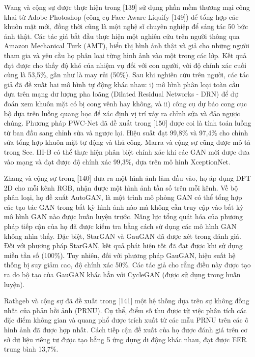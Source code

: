 \documentclass{article}
\begin{document}
Wang và cộng sự được thực hiện trong [139] sử dụng phần mềm thương mại công khai từ Adobe Photoshop (công cụ Face-Aware Liquify [149]) để tổng hợp các khuôn mặt mới, đồng thời cũng là một nghệ sĩ chuyên nghiệp để sáng tác 50 bức ảnh thật. Các tác giả bắt đầu thực hiện một nghiên cứu trên người thông qua Amazon Mechanical Turk (AMT), hiển thị hình ảnh thật và giả cho những người tham gia và yêu cầu họ phân loại từng hình ảnh vào một trong các lớp. Kết quả đạt được cho thấy độ khó của nhiệm vụ đối với con người, với độ chính xác cuối cùng là 53,5\%, gần như là may rủi (50\%). Sau khi nghiên cứu trên người, các tác giả đã đề xuất hai mô hình tự động khác nhau: i) mô hình phân loại toàn cầu dựa trên mạng dư lượng pha loãng (Dilated Residual Networks - DRN) để dự đoán xem khuôn mặt có bị cong vênh hay không, và ii) công cụ dự báo cong cục bộ dựa trên luồng quang học để xác định vị trí xảy ra chỉnh sửa và đảo ngược chúng. Phương pháp PWC-Net đã đề xuất trong [150] được coi là tính toán luồng từ ban đầu sang chỉnh sửa và ngược lại. Hiệu suất đạt 99,8\% và 97,4\% cho chỉnh sửa tổng hợp khuôn mặt tự động và thủ công.
Marra và cộng sự cũng được mô tả trong Sec. III-B có thể thực hiện phân biệt chính xác khi các GAN mới được đưa vào mạng và đạt được độ chính xác 99,3\%, dựa trên mô hình XceptionNet.

Zhang và cộng sự trong [140] đưa ra một hình ảnh làm đầu vào, họ áp dụng DFT 2D cho mỗi kênh RGB, nhận được một hình ảnh tần số trên mỗi kênh. Về bộ phân loại, họ đề xuất AutoGAN, là một trình mô phỏng GAN có thể tổng hợp các tạo tác GAN trong bất kỳ hình ảnh nào mà không cần truy cập vào bất kỳ mô hình GAN nào được huấn luyện trước. Năng lực tổng quát hóa của phương pháp tiếp cận của họ đã được kiểm tra bằng cách sử dụng các mô hình GAN không nhìn thấy. Đặc biệt, StarGAN và GauGAN đã được xét trong đánh giá. Đối với phương pháp StarGAN, kết quả phát hiện tốt đã đạt được khi sử dụng miền tần số (100\%). Tuy nhiên, đối với phương pháp GauGAN, hiệu suất hệ thống bị suy giảm cao, độ chính xác 50\%. Các tác giả cho rằng điều này được tạo ra do bộ tạo của GauGAN khác hẳn với CycleGAN (được sử dụng trong huấn luyện).

Rathgeb và cộng sự đã đề xuất trong [141] một hệ thống dựa trên sự không đồng nhất của phản hồi ảnh (PRNU). Cụ thể, điểm số thu được từ việc phân tích các đặc điểm không gian và quang phổ được trích xuất từ các mẫu PRNU trên các ô hình ảnh đã được hợp nhất. Cách tiếp cận đề xuất của họ được đánh giá trên cơ sở dữ liệu riêng tư được tạo bằng 5 ứng dụng di động khác nhau, đạt được EER trung bình 13,7\%.
\end{document}
